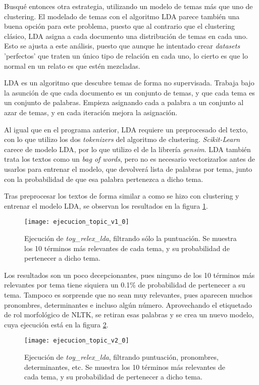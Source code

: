 \documentclass{pre-tfg}
\begin{document}
Busqué entonces otra estrategia, utilizando un modelo de temas más que uno de clustering. El modelado de temas con el algoritmo LDA parece también una buena opción para este problema, puesto que al contrario que el clustering clásico, LDA asigna a cada documento una distribución de temas en cada uno. Esto se ajusta a este análisis, puesto que aunque he intentado crear \textit{datasets} 'perfectos' que traten un único tipo de relación en cada uno, lo cierto es que lo normal en un relato es que estén mezcladas.

LDA es un algoritmo que descubre temas de forma no supervisada. Trabaja bajo la asunción de que cada documento es un conjunto de temas, y que cada tema es un conjunto de palabras. Empieza asignando cada a palabra a un conjunto al azar de temas, y en cada iteración mejora la asignación. 

Al igual que en el programa anterior, LDA requiere un preprocesado del texto, con lo que utilizo los dos \textit{tokenizers} del algoritmo de clustering. \textit{Scikit-Learn} carece de modelo LDA, por lo que utilizo el de la librería \textit{gensim}. LDA también trata los textos como un \textit{bag of words}, pero no es necesario vectorizarlos antes de usarlos para entrenar el modelo, que devolverá  lista de palabras por tema, junto con la probabilidad de que esa palabra pertenezca a dicho tema.

Tras preprocesar los textos de forma similar a como se hizo con clustering y entrenar el modelo LDA, se observan los resultados en la figura \ref{fig:topicresult1}.

\begin{figure}
	\hspace{-2cm}
	\texttt{[image: ejecucion\_topic\_v1\_0]}
	\caption{Ejecución de \textit{toy\_relex\_lda}, filtrando sólo la puntuación. Se muestra los 10 términos más relevantes de cada tema, y su probabilidad de pertenecer a dicho tema.}
	\label{fig:topicresult1}
\end{figure}

Los resultados son un poco decepcionantes, pues ninguno de los 10 términos más relevantes por tema tiene siquiera un 0.1\% de probabilidad de pertenecer a su tema.
Tampoco es sorprende que no sean muy relevantes, pues aparecen muchos pronombres, determinantes e incluso algún número. Aprovechando el etiquetado de rol morfológico de NLTK, se retiran esas palabras y se crea un nuevo modelo, cuya ejecución está en la figura \ref{fig:topicresult2}.

\begin{figure}
	\hspace{-2cm}
	\texttt{[image: ejecucion\_topic\_v2\_0]}
	\caption{Ejecución de \textit{toy\_relex\_lda}, filtrando puntuación, pronombres, determinantes, etc. Se muestra los 10 términos más relevantes de cada tema, y su probabilidad de pertenecer a dicho tema.}
	\label{fig:topicresult2}
\end{figure}
\end{document}
